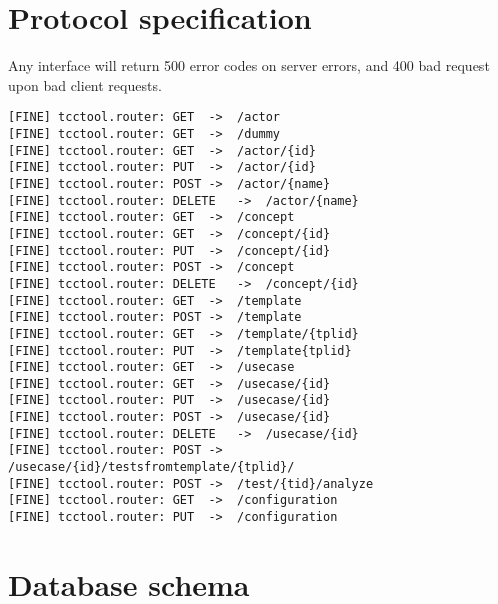 



\chapter{Protocol specification}
Any interface will return 500 error codes on server errors, and 400 bad request upon bad client requests.
\begin{verbatim}
[FINE] tcctool.router: GET	->	/actor
[FINE] tcctool.router: GET	->	/dummy
[FINE] tcctool.router: GET	->	/actor/{id}
[FINE] tcctool.router: PUT	->	/actor/{id}
[FINE] tcctool.router: POST	->	/actor/{name}
[FINE] tcctool.router: DELETE	->	/actor/{name}
[FINE] tcctool.router: GET	->	/concept
[FINE] tcctool.router: GET	->	/concept/{id}
[FINE] tcctool.router: PUT	->	/concept/{id}
[FINE] tcctool.router: POST	->	/concept
[FINE] tcctool.router: DELETE	->	/concept/{id}
[FINE] tcctool.router: GET	->	/template
[FINE] tcctool.router: POST	->	/template
[FINE] tcctool.router: GET	->	/template/{tplid}
[FINE] tcctool.router: PUT	->	/template{tplid}
[FINE] tcctool.router: GET	->	/usecase
[FINE] tcctool.router: GET	->	/usecase/{id}
[FINE] tcctool.router: PUT	->	/usecase/{id}
[FINE] tcctool.router: POST	->	/usecase/{id}
[FINE] tcctool.router: DELETE	->	/usecase/{id}
[FINE] tcctool.router: POST	->	/usecase/{id}/testsfromtemplate/{tplid}/
[FINE] tcctool.router: POST	->	/test/{tid}/analyze
[FINE] tcctool.router: GET	->	/configuration
[FINE] tcctool.router: PUT	->	/configuration
\end{verbatim}

\chapter{Database schema}
